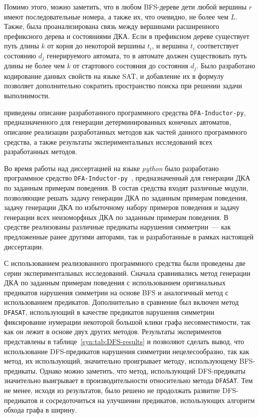 Помимо этого, можно заметить, что в любом BFS-дереве дети любой вершины $r$ имеют последовательные номера, а также их, что очевидно, не более чем $L$.
Также, была проанализирована связь между вершинами расширенного префиксного дерева и состояниями ДКА.
Если в префиксном дереве существует путь длины $k$ от корня до некоторой вершины $t_{i}$, и вершина $t_{i}$ соответствует состоянию $d_{j}$ генерируемого автомата, то в автомате должен существовать путь длины не более чем $k$ от стартового состояния до состояния $d_{j}$.
Было разработано кодирование данных свойств на языке SAT, и добавление их в формулу позволяет дополнительно сократить пространство поиска при решении задачи выполнимости.

\insection{\ref{sec:space:results}} приведены описание разработанного программного средства \texttt{DFA-Inductor-py}, предназначенного для генерации детерминированных конечных автоматов, описание реализации разработанных методов как частей данного программного средства, а также результаты экспериментальных исследований всех разработанных методов. 

Во время работы над диссертацией на языке \emph{python} было разработано программное средство \texttt{DFA-Inductor-py}~\cite{dfa-inductor-py}, предназначенный для генерации ДКА по заданным примерам поведения.
В состав средства входят различные модули, позволяющие решать задачу генерации ДКА по заданным примерам поведения, задачу генерации ДКА по избыточному набору примеров поведения и задачу генерации всех неизоморфных ДКА по заданным примерам поведения.
В средстве реализованы различные предикаты нарушения симметрии~--- как предложенные ранее другими авторами, так и разработанные в рамках настоящей диссертации.

С использованием реализованного программного средства были проведены две серии экспериментальных исследований.
Сначала сравнивались метод генерации ДКА по заданным примерам поведения с использованием оригинальных предикатов нарушения симметрии на основе BFS и аналогичный метод с использованием предикатов.
Дополнительно в сравнение был включен метод \texttt{DFASAT}, использующий в качестве предикатов нарушения симметрии фиксирование нумерации некоторой большой клики графа несовместимости, так как он лежит в основе двух других методов. 
Результаты экспериментов представлены в таблице~\ref{syn:tab:DFS-results} и позволяют сделать вывод, что использование DFS-предикатов нарушения симметрии нецелесообразно, так как метод, их использующий, значительно проигрывает методу, использующему BFS-предикаты.
Однако можно заметить, что метод, использующий DFS-предикаты значительно выигрывает в производительности относительно метода \texttt{DFASAT}.
Тем не менее, исходя из результатов, было решено не продолжать развитие DFS-предикатов и сосредоточиться на улучшении предикатов, использующих алгоритм обхода графа в ширину.

